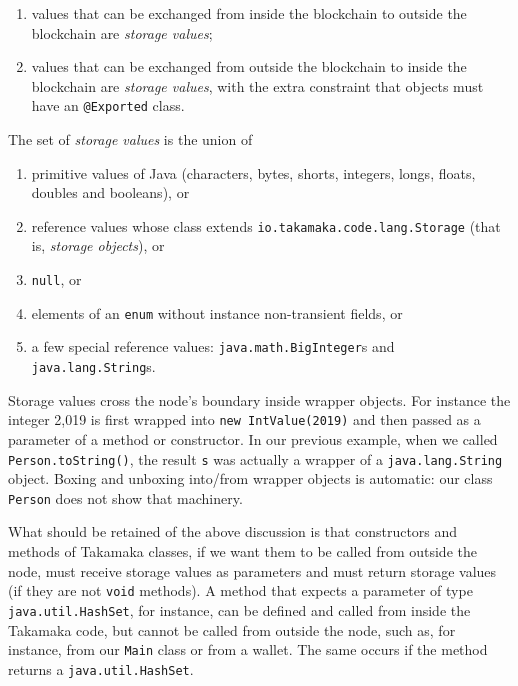 \documentclass[a4paper,]{book}
\providecommand{\tightlist}{%
  \setlength{\itemsep}{0pt}\setlength{\parskip}{0pt}}
\begin{document}
{\begin{enumerate}
\def\labelenumi{\arabic{enumi}.}
\tightlist
\item
  values that can be exchanged from inside the blockchain to outside the
  blockchain are \emph{storage values};
\item
  values that can be exchanged from outside the blockchain to inside the
  blockchain are \emph{storage values}, with the extra constraint that
  objects must have an \texttt{@Exported} class.
\end{enumerate}

The set of \emph{storage values} is the union of

\begin{enumerate}
\def\labelenumi{\arabic{enumi}.}
\tightlist
\item
  primitive values of Java (characters, bytes, shorts, integers, longs,
  floats, doubles and booleans), or
\item
  reference values whose class extends
  \texttt{io.takamaka.code.lang.Storage} (that is, \emph{storage
  objects}), or
\item
  \texttt{null}, or
\item
  elements of an \texttt{enum} without instance non-transient fields, or
\item
  a few special reference values: \texttt{java.math.BigInteger}s and
  \texttt{java.lang.String}s.
\end{enumerate}

Storage values cross the node's boundary inside wrapper objects. For
instance the integer 2,019 is first wrapped into
\texttt{new\ IntValue(2019)} and then passed as a parameter of a method
or constructor. In our previous example, when we called
\texttt{Person.toString()}, the result \texttt{s} was actually a wrapper
of a \texttt{java.lang.String} object. Boxing and unboxing into/from
wrapper objects is automatic: our class \texttt{Person} does not show
that machinery.

What should be retained of the above discussion is that constructors and
methods of Takamaka classes, if we want them to be called from outside
the node, must receive storage values as parameters and must return
storage values (if they are not \texttt{void} methods). A method that
expects a parameter of type \texttt{java.util.HashSet}, for instance,
can be defined and called from inside the Takamaka code, but cannot be
called from outside the node, such as, for instance, from our
\texttt{Main} class or from a wallet. The same occurs if the method
returns a \texttt{java.util.HashSet}.

}
\end{document}
